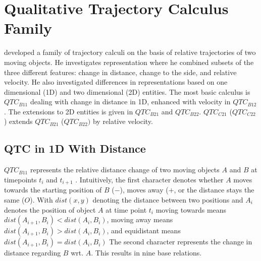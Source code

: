 
\section{Qualitative Trajectory Calculus Family}\label{sec:qtc}
\citet{Weghe04_PhD} developed a family of trajectory calculi on the basis of relative trajectories of two moving objects.
He investigates representation where he combined subsets of the three different features:
change in distance, change to the side, and relative velocity.
He also investigated differences in representations based on one dimensional (1D) and two dimensional (2D) entities.
The most basic calculus is $QTC_{B11}$ dealing with change in distance in 1D,
enhanced with velocity in $QTC_{B12}$.
The extensions to 2D entities is given in $QTC_{B21}$ and $QTC_{B22}$.
$QTC_{C21}$ ($QTC_{C22}$) extends $QTC_{B21}$ ($QTC_{B22})$ by relative velocity.


\subsection*{QTC in 1D With Distance}\label{sec:qtc-b11}

$QTC_{B11}$ represents the relative distance change of two moving objects $A$ and $B$ at
timepoints $t_i$ and $t_{i+1}$ .
Intuitively, the first character denotes whether $A$ moves towards the starting position of $B$ ($-$), moves away ($+$, or the distance stays the same ($O$).
With $dist(x,y)$ denoting the distance between two positions
and $A_i$ denotes the position of object $A$ at time point $t_i$
moving towards means $dist(A_{i+1}, B_{i})<dist(A_{i}, B_{i})$,
moving away means $dist(A_{i+1}, B_{i})>dist(A_{i}, B_{i})$,
and equidistant means $dist(A_{i+1}, B_{i})=dist(A_{i}, B_{i})$
The second character represents the change in distance regarding $B$ wrt. $A$.
This results in nine base relations.


